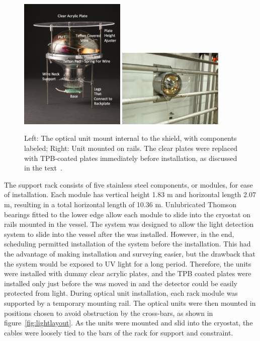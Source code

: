 \begin{figure}[t]
\centering	
\includegraphics[width=0.45\textwidth]{./light_figures/mountedpmtlabeled.jpg}
\includegraphics[width=0.45\textwidth]{./light_figures/PMTunit2.pdf}
\caption{Left: The optical unit mount internal to the shield, with components labeled; Right: Unit mounted on rails.  The clear plates were replaced with TPB-coated plates immediately before \lartpc installation, as discussed in the text~\cite{Briese:2013wua,Katori:2013wqa}.}
\label{fig:unitmodel}
\end{figure}

The support rack consists of five stainless steel components, or modules, for ease of installation.  Each module has vertical height 1.83 m and horizontal length 2.07 m, resulting in a total horizontal length of 10.36 m.  Unlubricated Thomson bearings fitted to the lower edge allow each module to slide into the cryostat on rails mounted in the vessel.   The system was designed to allow the light detection system to slide into the vessel after the \lartpc was installed.  However, in the end, scheduling permitted installation of the system before the \lartpc installation.  This had the advantage of making installation and surveying easier, but the drawback that the system would be exposed to UV light for a long period.  Therefore, the units were installed with dummy clear acrylic plates, and the TPB coated plates were installed only just before the \lartpc was moved in and the detector could be easily protected from light.  During optical unit installation, each rack module was supported by a temporary mounting rail.  The optical units were then mounted in positions chosen to avoid obstruction by the \lartpc cross-bars, as shown in figure~\ref{fig:lightlayout}.  As the units were mounted and slid into the cryostat, the cables were loosely tied to the bars of the rack for support and constraint.  

